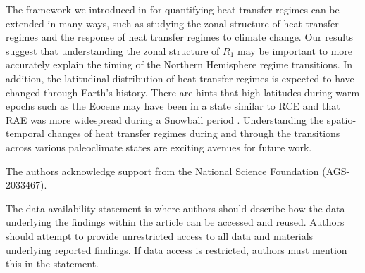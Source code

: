 \documentclass{ametsocV5}
\begin{document}
The framework we introduced in for quantifying heat transfer regimes can be extended in many ways, such as studying the zonal structure of heat transfer regimes and the response of heat transfer regimes to climate change. Our results suggest that understanding the zonal structure of $R_1$ may be important to more accurately explain the timing of the Northern Hemisphere regime transitions. In addition, the latitudinal distribution of heat transfer regimes is expected to have changed through Earth's history. There are hints that high latitudes during warm epochs such as the Eocene may have been in a state similar to RCE \citep{abbot2008a} and that RAE was more widespread during a Snowball period \citep{pierrehumbert2005}. Understanding the spatio-temporal changes of heat transfer regimes during and through the transitions across various paleoclimate states are exciting avenues for future work.

\acknowledgments
The authors acknowledge support from the National Science Foundation (AGS-2033467).

% 
%
\datastatement
The data availability statement is where authors should describe how the data underlying 
the findings within the article can be accessed and reused. Authors should attempt to 
provide unrestricted access to all data and materials underlying reported findings. 
If data access is restricted, authors must mention this in the statement.

%



\end{document}
